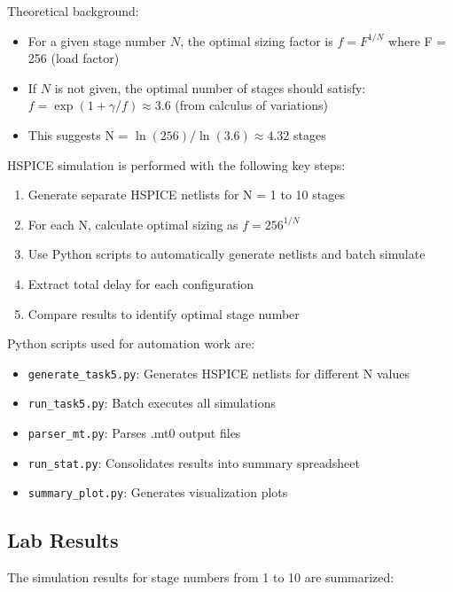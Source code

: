 \documentclass[UTF8,12pt,a4paper]{ctexart}
\begin{document}
Theoretical background:
\begin{itemize}
    \item For a given stage number $N$, the optimal sizing factor is $f = F^{1/N}$ where F = 256 (load factor)
    \item If $N$ is not given, the optimal number of stages should satisfy: $f = \exp(1 + \gamma/f) \approx 3.6$ (from calculus of variations)
    \item This suggests N = $\ln(256)/\ln(3.6) \approx 4.32$ stages
\end{itemize}

HSPICE simulation is performed with the following key steps:
\begin{enumerate}
    \item[1. ] Generate separate HSPICE netlists for N = 1 to 10 stages
    \item[2. ] For each N, calculate optimal sizing as $f = 256^{1/N}$
    \item[3. ] Use Python scripts to automatically generate netlists and batch simulate
    \item[4. ] Extract total delay for each configuration
    \item[5. ] Compare results to identify optimal stage number
\end{enumerate}

Python  scripts used for automation work are:
\begin{itemize}
    \item[1. ] \texttt{generate\_task5.py}: Generates HSPICE netlists for different N values
    \item[2. ] \texttt{run\_task5.py}: Batch executes all simulations
    \item[3. ] \texttt{parser\_mt.py}: Parses .mt0 output files
    \item[4. ] \texttt{run\_stat.py}: Consolidates results into summary spreadsheet
    \item[5. ] \texttt{summary\_plot.py}: Generates visualization plots
\end{itemize}

\subsection{Lab Results}

The simulation results for stage numbers from 1 to 10 are summarized:
\end{document}
